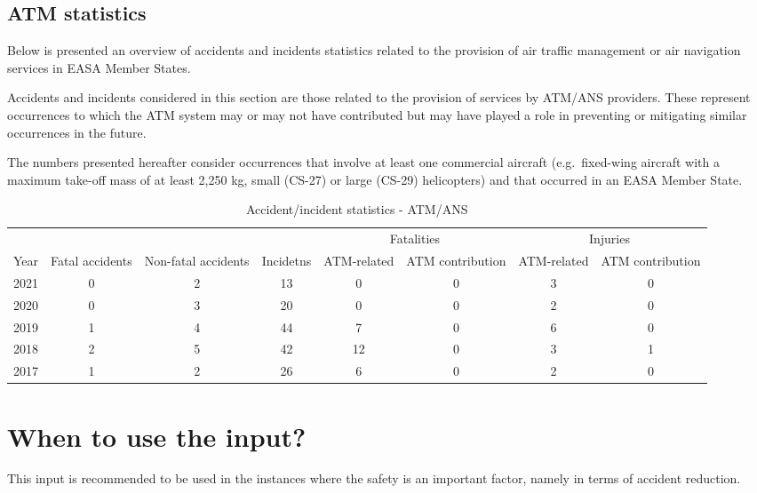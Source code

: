 \documentclass[
  11pt,
  a4paper,
]{book}
\begin{document}
\hypertarget{atm-statistics}{%
\subsection{ATM statistics}\label{atm-statistics}}

Below is presented an overview of accidents and incidents statistics
related to the provision of air traffic management or air navigation
services in EASA Member States.

Accidents and incidents considered in this section are those related to
the provision of services by ATM/ANS providers. These represent
occurrences to which the ATM system may or may not have contributed but
may have played a role in preventing or mitigating similar occurrences
in the future.

The numbers presented hereafter consider occurrences that involve at
least one commercial aircraft (e.g.~fixed-wing aircraft with a maximum
take-off mass of at least 2,250 kg, small (CS-27) or large (CS-29)
helicopters) and that occurred in an EASA Member State.

\hypertarget{tbl-statistics-atm}{}
\begin{longtable}{rccccccc}
\caption{\label{tbl-statistics-atm}Accident/incident statistics - ATM/ANS }\tabularnewline

\toprule
 &  &  &  & \multicolumn{2}{c}{Fatalities} & \multicolumn{2}{c}{Injuries} \\ 
\cmidrule(lr){5-6} \cmidrule(lr){7-8}
Year & Fatal accidents & Non-fatal accidents & Incidetns & ATM-related & ATM contribution & ATM-related & ATM contribution \\ 
\midrule
2021 & 0 & 2 & 13 & 0 & 0 & 3 & 0 \\ 
2020 & 0 & 3 & 20 & 0 & 0 & 2 & 0 \\ 
2019 & 1 & 4 & 44 & 7 & 0 & 6 & 0 \\ 
2018 & 2 & 5 & 42 & 12 & 0 & 3 & 1 \\ 
2017 & 1 & 2 & 26 & 6 & 0 & 2 & 0 \\ 
\bottomrule
\end{longtable}

\hypertarget{when-to-use-the-input-9}{%
\section{When to use the input?}\label{when-to-use-the-input-9}}

This input is recommended to be used in the instances where the safety
is an important factor, namely in terms of accident reduction.
\end{document}
